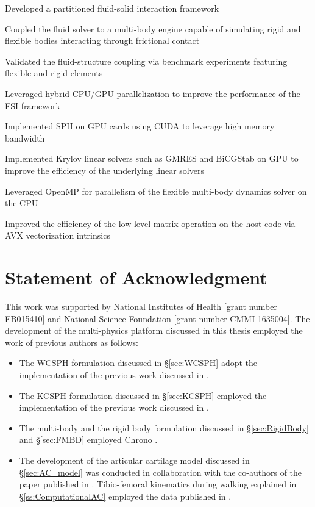 \begin{compactitem}
	\item Developed a partitioned fluid-solid interaction framework
	\begin{compactitem} 
		\item  Coupled the fluid solver to a multi-body engine capable of simulating rigid and flexible bodies  interacting through frictional contact
		\item  Validated the fluid-structure coupling via benchmark experiments featuring flexible and rigid elements
	\end{compactitem}
	
	
	\item Leveraged hybrid CPU/GPU parallelization to improve the performance of the FSI framework 
	\begin{compactitem} 
		\item Implemented SPH on GPU cards using CUDA  to leverage high memory bandwidth
		\item Implemented Krylov linear solvers such as GMRES and BiCGStab on GPU to improve the efficiency of the underlying linear solvers
		\item Leveraged OpenMP for parallelism of the flexible multi-body dynamics solver on the CPU
		\item Improved the efficiency of the low-level matrix operation on the host code via AVX vectorization intrinsics
	\end{compactitem}
\end{compactitem} 

\section{Statement of Acknowledgment}
 This work was supported by National Institutes of Health [grant number EB015410] and National Science Foundation [grant number CMMI 1635004]. The development of the  multi-physics platform discussed in this thesis employed the work of previous authors as follows:
\begin{itemize}
	\item The WCSPH formulation discussed in \S\ref{sec:WCSPH} adopt the  implementation of the previous work discussed in \cite{PazoukiPhDThesis2014}.
	\item The KCSPH formulation discussed in \S\ref{sec:KCSPH} employed the implementation of the previous work  discussed in \cite{hammadPhDThesis}.
	\item The multi-body and the rigid body formulation discussed in \S\ref{sec:RigidBody} and \S\ref{sec:FMBD} employed Chrono \cite{chronoOverview2016,chronoOverview2013}.
	\item The development of the articular cartilage model discussed in \S\ref{sec:AC_model} was conducted in collaboration with the co-authors of the paper published in \cite{rakhsha2019simulation}.  Tibio-femoral kinematics during walking explained in \S\ref{ss:ComputationalAC} employed the data published in \cite{Smith2016,Smith2016influence2}.
\end{itemize} 

